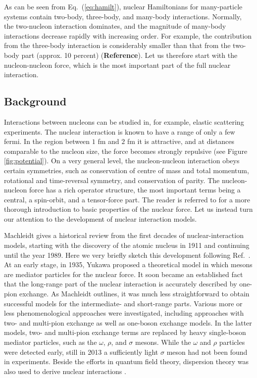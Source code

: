 \documentclass[a4paper,12pt]{report}
\begin{document}
As can be seen from Eq.~(\ref{eq:hamilt}), 
nuclear Hamiltonians for many-particle systems contain 
two-body, three-body, and many-body interactions. Normally, 
the two-nucleon interaction dominates, and the magnitude of 
many-body interactions decrease rapidly with increasing order. 
For example, the contribution from the three-body interaction 
is considerably smaller than that from the two-body 
part (approx. 10 percent) (\textbf{Reference}). Let us therefore start with the nucleon-nucleon 
force, which is the most important part of the full nuclear 
interaction.


\subsection{Background}

Interactions between nucleons can be studied in, for 
example, elastic scattering experiments. The nuclear 
interaction is known to have a range of only a few
fermi. In the region between $1$ fm and $2$ fm it is 
attractive, and at distances comparable to the nucleon size, 
the force becomes strongly repulsive (see Figure 
\ref{fig:potential}). On a very general level, the 
nucleon-nucleon interaction obeys certain symmetries, 
such as conservation of centre of mass and total momentum,
rotational and time-reversal symmetry, and conservation
of parity. The nucleon-nucleon force 
has a rich operator structure, the most important 
terms being a central, a spin-orbit, and a tensor-force
part. The reader is referred to \cite{wong_book,
ring_schuck} for a more thorough introduction to basic 
properties of the nuclear force. Let us instead turn our  
attention to the development of nuclear interaction
models.    

Machleidt gives a historical review \cite{machleidt1989} 
from the first decades of nuclear-interaction models, 
starting with the discovery of the atomic nucleus in 1911 
and continuing until the year 1989. Here we very briefly 
sketch this development following Ref.~\cite{machleidt1989}. 
At an early stage, in 1935, Yukawa proposed \cite{yukawa1935} 
a theoretical model in which mesons are mediator particles 
for the nuclear 
force. It soon became an established fact that the long-range  
part of the nuclear interaction is accurately described 
by one-pion exchange. As Machleidt outlines, it was much 
less straightforward to obtain successful models for the 
intermediate- and short-range parts. Various more or less
phenomenological approaches were investigated, including
approaches with two- and multi-pion exchange as well as 
one-boson exchange models. In the latter models, 
two- and multi-pion exchange terms are replaced by 
heavy single-boson mediator particles, such as the 
$\omega $, $\rho $, and $\sigma $ mesons. While the
$\omega $ and $\rho $ particles were detected early, 
still in 2013 a sufficiently light $\sigma $ meson
had not been found \cite{abbas2013} in experiments. 
Beside the efforts in quantum field theory, 
dispersion theory was also used to derive nuclear 
interactions \cite{machleidt1989}. 
\end{document}

